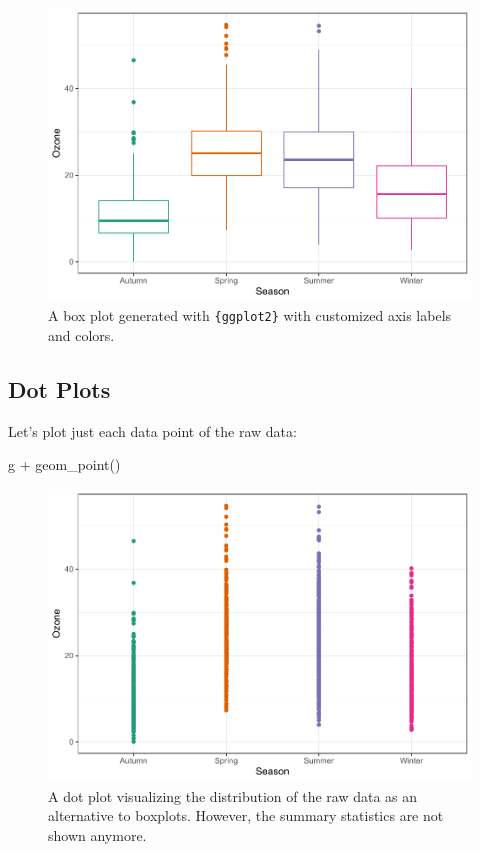 \documentclass[
]{krantz}
\makeatletter
\newenvironment{Shaded}{\begin{snugshade}}{\end{snugshade}}
\newcommand{\FunctionTok}[1]{\textcolor[rgb]{0,0,0}{#1}}
\newcommand{\NormalTok}[1]{#1}
\newcommand{\SpecialCharTok}[1]{\textcolor[rgb]{0,0,0}{#1}}
\newenvironment{kframe}{%
\medskip{}
\setlength{\fboxsep}{.8em}
 \def\at@end@of@kframe{}%
 \ifinner\ifhmode%
  \def\at@end@of@kframe{\end{minipage}}%
  \begin{minipage}{\columnwidth}%
 \fi\fi%
 \def\FrameCommand##1{\hskip\@totalleftmargin \hskip-\fboxsep
 \colorbox{shadecolor}{##1}\hskip-\fboxsep
     \hskip-\linewidth \hskip-\@totalleftmargin \hskip\columnwidth}%
 \MakeFramed {\advance\hsize-\width
   \@totalleftmargin\z@ \linewidth\hsize
   \@setminipage}}%
 {\par\unskip\endMakeFramed%
 \at@end@of@kframe}
\renewenvironment{Shaded}{\begin{kframe}}{\end{kframe}}
\makeatother
\begin{document}
\begin{figure}
\centering
\includegraphics{bookdown_files/figure-latex/boxplot-1.pdf}
\caption{\label{fig:boxplot}A box plot generated with \texttt{\{ggplot2\}} with customized axis labels and colors.}
\end{figure}

\hypertarget{dot-plots}{%
\subsection{Dot Plots}\label{dot-plots}}

Let's plot just each data point of the raw data:

\begin{Shaded}
\begin{Highlighting}[]
\NormalTok{g }\SpecialCharTok{+} \FunctionTok{geom\_point}\NormalTok{()}
\end{Highlighting}
\end{Shaded}

\begin{figure}
\centering
\includegraphics{bookdown_files/figure-latex/point-1.pdf}
\caption{\label{fig:point}A dot plot visualizing the distribution of the raw data as an alternative to boxplots. However, the summary statistics are not shown anymore.}
\end{figure}
\end{document}
